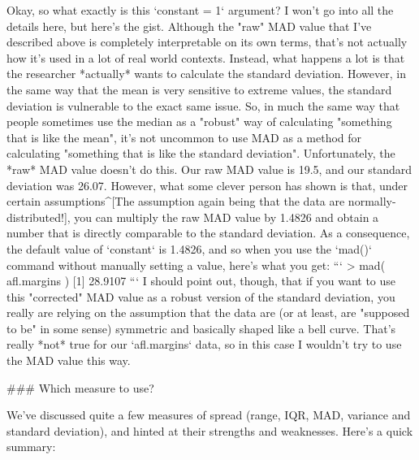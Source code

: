 Okay, so what exactly is this `constant = 1` argument? I won't go into all the details here, but here's the gist. Although the "raw" MAD value that I've described above is completely interpretable on its own terms, that's not actually how it's used in a lot of real world contexts. Instead, what happens a lot is that the researcher *actually* wants to calculate the standard deviation. However, in the same way that the mean is very sensitive to extreme values, the standard deviation is vulnerable to the exact same issue. So, in much the same way that people sometimes use the median as a "robust" way of calculating "something that is like the mean", it's not uncommon to use MAD as a method for calculating "something that is like the standard deviation". Unfortunately, the *raw* MAD value doesn't do this. Our raw MAD value is 19.5, and our standard deviation was 26.07. However, what some clever person has shown is that, under certain assumptions^[The assumption again being that the data are normally-distributed!], you can multiply the raw MAD value by 1.4826 and obtain a number that is directly comparable to the standard deviation. As a consequence, the default value of `constant` is 1.4826, and so when you use the `mad()` command without manually setting a value, here's what you get:
```
> mad( afl.margins )
[1] 28.9107
```
I should point out, though, that if you want to use this "corrected" MAD value as a robust version of the standard deviation, you really are relying on the assumption that the data are (or at least, are "supposed to be" in some sense) symmetric and basically shaped like a bell curve. That's really *not* true for our `afl.margins` data, so in this case I wouldn't try to use the MAD value this way.


### Which measure to use?

We've discussed quite a few measures of spread (range, IQR, MAD, variance and standard deviation), and hinted at their strengths and weaknesses. Here's a quick summary:


